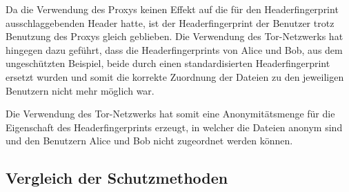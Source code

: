 \documentclass[
    fontsize=12pt,
    headings=small,
    parskip=half,           %
    bibliography=totoc,
    numbers=noenddot,       %
    open=any,               %
    ]{scrreprt}
\begin{document}
Da die Verwendung des Proxys keinen Effekt auf die für den Headerfingerprint ausschlaggebenden Header hatte, ist der Headerfingerprint der Benutzer trotz Benutzung des Proxys gleich geblieben. 
Die Verwendung des Tor-Netzwerks hat hingegen dazu geführt, dass die Headerfingerprints von Alice und Bob, aus dem ungeschützten Beispiel, beide durch einen standardisierten Headerfingerprint ersetzt wurden und somit die korrekte Zuordnung der Dateien zu den jeweiligen Benutzern nicht mehr möglich war.

Die Verwendung des Tor-Netzwerks hat somit eine Anonymitätsmenge für die Eigenschaft des Headerfingerprints erzeugt, in welcher die Dateien anonym sind und den Benutzern Alice und Bob nicht zugeordnet werden können.

\subsection{Vergleich der Schutzmethoden}
\end{document}
